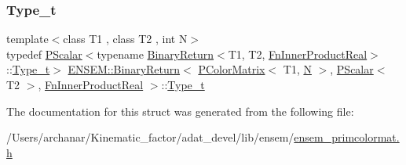 \subsubsection{\texorpdfstring{Type\_t}{Type\_t}\hspace{0.1cm}{\footnotesize\ttfamily [2/2]}}
{\footnotesize\ttfamily template$<$class T1 , class T2 , int N$>$ \\
typedef \mbox{\hyperlink{classENSEM_1_1PScalar}{P\+Scalar}}$<$typename \mbox{\hyperlink{structENSEM_1_1BinaryReturn}{Binary\+Return}}$<$T1, T2, \mbox{\hyperlink{structENSEM_1_1FnInnerProductReal}{Fn\+Inner\+Product\+Real}}$>$\+::\mbox{\hyperlink{structENSEM_1_1BinaryReturn_3_01PColorMatrix_3_01T1_00_01N_01_4_00_01PScalar_3_01T2_01_4_00_01FnInnerProductReal_01_4_a89996945f4c4257d5ba835eb45c1b5d6}{Type\+\_\+t}}$>$ \mbox{\hyperlink{structENSEM_1_1BinaryReturn}{E\+N\+S\+E\+M\+::\+Binary\+Return}}$<$ \mbox{\hyperlink{classENSEM_1_1PColorMatrix}{P\+Color\+Matrix}}$<$ T1, \mbox{\hyperlink{operator__name__util_8cc_a7722c8ecbb62d99aee7ce68b1752f337}{N}} $>$, \mbox{\hyperlink{classENSEM_1_1PScalar}{P\+Scalar}}$<$ T2 $>$, \mbox{\hyperlink{structENSEM_1_1FnInnerProductReal}{Fn\+Inner\+Product\+Real}} $>$\+::\mbox{\hyperlink{structENSEM_1_1BinaryReturn_3_01PColorMatrix_3_01T1_00_01N_01_4_00_01PScalar_3_01T2_01_4_00_01FnInnerProductReal_01_4_a89996945f4c4257d5ba835eb45c1b5d6}{Type\+\_\+t}}}



The documentation for this struct was generated from the following file\+:\begin{DoxyCompactItemize}
\item 
/\+Users/archanar/\+Kinematic\+\_\+factor/adat\+\_\+devel/lib/ensem/\mbox{\hyperlink{lib_2ensem_2ensem__primcolormat_8h}{ensem\+\_\+primcolormat.\+h}}\end{DoxyCompactItemize}
